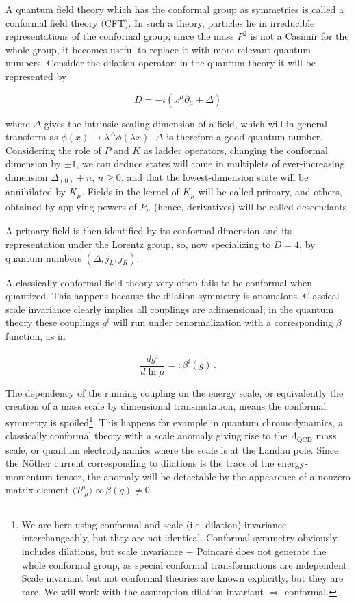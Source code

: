 A quantum field theory which has the conformal group as symmetries is called a conformal field theory (CFT). In such a theory, particles lie in irreducible representations of the conformal group; since the mass $P^2$ is not a Casimir for the whole group, it becomes useful to replace it with more relevant quantum numbers. Consider the dilation operator: in the quantum theory it will be represented by

\begin{equation}
	D = -i (x^\mu\partial_\mu + \Delta)
	\label{}
\end{equation}

where $\Delta$ gives the intrinsic scaling dimension of a field, which will in general transform as $\phi(x) \rightarrow \lambda^{\Delta} \phi(\lambda x)$. $\Delta$ is therefore a good quantum number. Considering the role of $P$ and $K$ as ladder operators, changing the conformal dimension by $\pm 1$, we can deduce states will come in multiplets of ever-increasing dimension $\Delta_{(0)} + n$, $n\geq 0$, and that the lowest-dimension state will be annihilated by $K_\mu$. Fields in the kernel of $K_\mu$ will be called primary, and others, obtained by applying powers of $P_\mu$ (hence, derivatives) will be called descendants.

A primary field is then identified by its conformal dimension and its representation under the Lorentz group, so, now specializing to $D=4$, by quantum numbers $(\Delta,j_L,j_R)$.

A classically conformal field theory very often fails to be conformal when quantized. This happens because the dilation symmetry is anomalous. Classical scale invariance clearly implies all couplings are adimensional; in the quantum theory these couplings $g^i$ will run under renormalization with a corresponding $\beta$ function, as in

\begin{equation}
	\frac{dg^i}{d\ln\mu} =: \beta^i(g)\,.
	\label{}
\end{equation}

The dependency of the running coupling on the energy scale, or equivalently the creation of a mass scale by dimensional transmutation, means the conformal symmetry is spoiled\footnote{We are here using conformal and scale (i.e. dilation) invariance interchangeably, but they are not identical. Conformal symmetry obviously includes dilations, but scale invariance $+$ Poincar\'e does not generate the whole conformal group, as special conformal transformations are independent. Scale invariant but not conformal theories are known explicitly\cite{scalebutnotconf}, but they are rare. We will work with the assumption dilation-invariant $\Rightarrow$ conformal.}. This happens for example in quantum chromodynamics, a classically conformal theory with a scale anomaly giving rise to the $\Lambda_\text{QCD}$ mass scale, or quantum electrodynamics where the scale is at the Landau pole. Since the N\"other current corresponding to dilations is the trace of the energy-momentum tensor, the anomaly will be detectable by the appearence of a nonzero matrix element $\langle T^{\mu}_{\;\,\mu} \rangle \propto \beta(g) \neq 0$.

